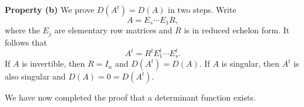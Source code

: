 \documentclass{ximera}
\begin{document}
{\bf Property (b)} We prove $D(A^t)=D(A)$ in two steps.  Write   
\begin{equation}  \label{e:Adecomp}
A=E_s\cdots E_1 R,
\end{equation}
where the $E_j$ are elementary row matrices and $R$ is in reduced echelon form.  It follows that 
\begin{equation}  \label{e:Atdecomp}
A^t = R^t E_1^t \cdots E_s^t.  
\end{equation}
If $A$ is invertible, then $R=I_n$ and $D(A^t) = D(A)$.  If $A$ is singular, then $A^t$ is also singular and  $D(A)=0=D(A^t)$. 

We have now completed the proof that a determinant function exists. 
\end{document}
